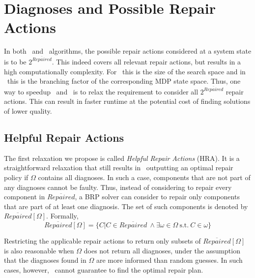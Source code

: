 \section{Diagnoses and Possible Repair Actions}
In both \myopic\ and \planbased\ algorithms, the possible repair actions considered at a system state is to be $2^{\overline{Repaired}}$. This indeed covers all relevant repair actions, but results in a high computationally complexity. For \myopic\ this is the size of the search space and in \planbased\ this is the branching factor of the corresponding MDP state space.
Thus, one way to speedup \myopic\ and \planbased\ is to relax the requirement to consider all $2^{\overline{Repaired}}$ repair actions. This can result in faster runtime at the potential cost of finding solutions of lower quality.

\subsection{Helpful Repair Actions}
The first relaxation we propose is called {\em Helpful Repair Actions} (HRA). It is a straightforward relaxation that still results in \planbased\ outputting an optimal repair policy if $\Omega$ contains all diagnoses.
In such a case, components that are not part of any diagnoses cannot be faulty. Thus, instead of considering to repair every component in $\overline{Repaired}$, a BRP solver can consider to repair only components that are part of at least one diagnosis. The set of such components is denoted by $\overline{Repaired}[\Omega]$. Formally,
\[ \overline{Repaired}[\Omega]=\{C|C\in \overline{Repaired}\ \wedge \exists \omega\in \Omega\ \text{s.t.}\ C\in\omega \}\]

Restricting the applicable repair actions to return only subsets of $\overline{Repaired}[\Omega]$ is also reasonable when $\Omega$ does not return all diagnoses, under the assumption that the diagnoses found in $\Omega$ are more informed than random guesses. In such cases, however, \planbased\ cannot guarantee to find the optimal repair plan.


